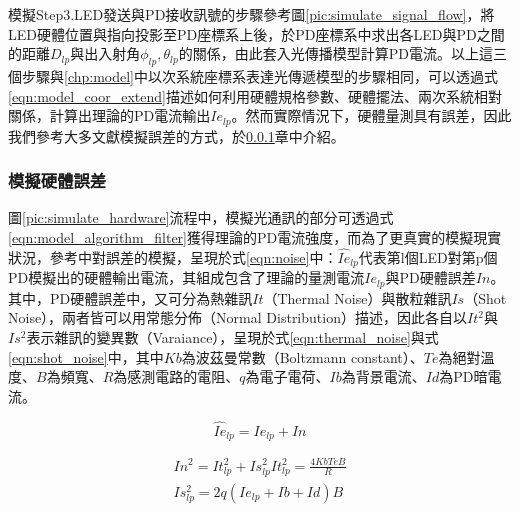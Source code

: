     模擬Step3.LED發送與PD接收訊號的步驟參考圖\ref{pic:simulate_signal_flow}，將LED硬體位置與指向投影至PD座標系上後，於PD座標系中求出各LED與PD之間的距離$D_{lp}$與出入射角$\phi_{lp},\theta_{lp}$的關係，由此套入光傳播模型計算PD電流。以上這三個步驟與\ref{chp:model}中以次系統座標系表達光傳遞模型的步驟相同，可以透過式\ref{eqn:model_coor_extend}描述如何利用硬體規格參數、硬體擺法、兩次系統相對關係，計算出理論的PD電流輸出$Ie_{lp}$。然而實際情況下，硬體量測具有誤差，因此我們參考大多文獻模擬誤差的方式，於\ref{chp:hardware_error}章中介紹。

    \subsubsection{模擬硬體誤差}
    \label{chp:hardware_error}

    圖\ref{pic:simulate_hardware}流程中，模擬光通訊的部分可透過式\ref{eqn:model_algorithm_filter}獲得理論的PD電流強度，而為了更真實的模擬現實狀況，參考\cite{survey_light2018}中對誤差的模擬，呈現於式\ref{eqn:noise}中：$\hat{Ie}_{lp}$代表第l個LED對第p個PD模擬出的硬體輸出電流，其組成包含了理論的量測電流$Ie_{lp}$與PD硬體誤差$In$。其中，PD硬體誤差中，又可分為熱雜訊$It$（Thermal Noise）與散粒雜訊$Is$（Shot Noise），兩者皆可以用常態分佈（Normal Distribution）描述，因此各自以$It^2$與$Is^2$表示雜訊的變異數（Varaiance），呈現於式\ref{eqn:thermal_noise}與式\ref{eqn:shot_noise}中，其中$Kb$為波茲曼常數（Boltzmann constant）、$Te$為絕對溫度、$B$為頻寬、$R$為感測電路的電阻、$q$為電子電荷、$Ib$為背景電流、$Id$為PD暗電流。

    \begin{equation}
    \label{eqn:noise}
        \hat{Ie}_{lp}=Ie_{lp}+In 
    \end{equation}


    \begin{gather}
        \label{eqn:thermal_noise}
        In^2 = {It_{lp}^2+Is_{lp}^2}
        It_{lp}^2={\frac{4 Kb Te B}{R}}\\
        \label{eqn:shot_noise}
        Is_{lp}^2={2q(Ie_{lp}+Ib+Id)B}
    \end{gather}



